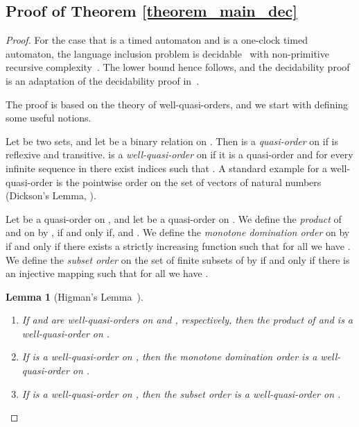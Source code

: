 \documentclass{CSML}
\theoremstyle{plain}\newtheorem{theorem}[thm]{Theorem}
\theoremstyle{plain}\newtheorem{corollary}[thm]{Corollary}
\theoremstyle{plain}\newtheorem{example}[thm]{Example}
\theoremstyle{plain}\newtheorem{lemma}[thm]{Lemma}
\theoremstyle{plain}\newtheorem{remark}[thm]{Remark}
\begin{document}
	\subsection{Proof of Theorem \ref{theorem_main_dec}}
	\begin{proof}
		For the case that  is a timed automaton and  is a one-clock timed automaton,
		the language inclusion problem  is decidable~\cite{DBLP:conf/lics/OuaknineW04} with non-primitive recursive complexity~\cite{DBLP:journals/fuin/AbdullaDOQW08}. 
		The lower bound hence follows, and the decidability proof is an adaptation of the decidability proof in~\cite{DBLP:conf/lics/OuaknineW04}.


		
		The proof is based on the theory of well-quasi-orders, and we start with defining some useful notions.
	
	Let  be two sets, and let  be a binary relation on .
	Then  is a \emph{quasi-order} on  if  is reflexive and transitive. 
	 is a \emph{well-quasi-order} on  if it is a quasi-order and for every infinite sequence  in  there exist indices  such that . 
	A standard example for a well-quasi-order is the pointwise order  on the set  of vectors of  natural numbers (Dickson's Lemma, \cite{Dickson1913}). 
	
	Let  be a quasi-order on , 
	and let  be a quasi-order on . 
	We define the \emph{product} of  and  on  by , if and only if,  and . 	
	We define the \emph{monotone domination order}  on  by  if and only if there exists a strictly increasing function  such that for all  we have . 
	We define the \emph{subset order}  on the set  of finite subsets of  by
	 if and only if there is an injective mapping  such that for all  we have . 
	


	\begin{lemma}[Higman's Lemma~\cite{Higman1952}]
		\label{lemma_higman}
		\begin{enumerate}
		\item If  and  are well-quasi-orders on  and , respectively, 
			then the product of  and  is a well-quasi-order on . 
	\item  If  is a well-quasi-order on ,
		then the monotone domination order  is a well-quasi-order on . 
	\item  If  is a well-quasi-order on ,
		then the subset order  is a well-quasi-order on . 
	\end{enumerate}
	\end{lemma}
		

\end{proof}
\end{document}
